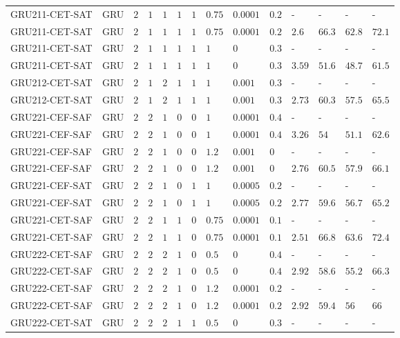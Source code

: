 \begin{table}[tbp]
\begin{tabular}{llllllllllllll}
GRU211-CET-SAT & GRU & $2$ & $1$ & $1$ & $1$ & $1$ & $0.75$ & $0.0001$ & $0.2$ & - & - & - & - \\
GRU211-CET-SAT & GRU & $2$ & $1$ & $1$ & $1$ & $1$ & $0.75$ & $0.0001$ & $0.2$ & $2.6$ & $66.3$ & $62.8$ & $72.1$ \\
GRU211-CET-SAT & GRU & $2$ & $1$ & $1$ & $1$ & $1$ & $1$ & $0$ & $0.3$ & - & - & - & - \\
GRU211-CET-SAT & GRU & $2$ & $1$ & $1$ & $1$ & $1$ & $1$ & $0$ & $0.3$ & $3.59$ & $51.6$ & $48.7$ & $61.5$ \\
GRU212-CET-SAT & GRU & $2$ & $1$ & $2$ & $1$ & $1$ & $1$ & $0.001$ & $0.3$ & - & - & - & - \\
GRU212-CET-SAT & GRU & $2$ & $1$ & $2$ & $1$ & $1$ & $1$ & $0.001$ & $0.3$ & $2.73$ & $60.3$ & $57.5$ & $65.5$ \\
GRU221-CEF-SAF & GRU & $2$ & $2$ & $1$ & $0$ & $0$ & $1$ & $0.0001$ & $0.4$ & - & - & - & - \\
GRU221-CEF-SAF & GRU & $2$ & $2$ & $1$ & $0$ & $0$ & $1$ & $0.0001$ & $0.4$ & $3.26$ & $54$ & $51.1$ & $62.6$ \\
GRU221-CEF-SAF & GRU & $2$ & $2$ & $1$ & $0$ & $0$ & $1.2$ & $0.001$ & $0$ & - & - & - & - \\
GRU221-CEF-SAF & GRU & $2$ & $2$ & $1$ & $0$ & $0$ & $1.2$ & $0.001$ & $0$ & $2.76$ & $60.5$ & $57.9$ & $66.1$ \\
GRU221-CEF-SAT & GRU & $2$ & $2$ & $1$ & $0$ & $1$ & $1$ & $0.0005$ & $0.2$ & - & - & - & - \\
GRU221-CEF-SAT & GRU & $2$ & $2$ & $1$ & $0$ & $1$ & $1$ & $0.0005$ & $0.2$ & $2.77$ & $59.6$ & $56.7$ & $65.2$ \\
GRU221-CET-SAF & GRU & $2$ & $2$ & $1$ & $1$ & $0$ & $0.75$ & $0.0001$ & $0.1$ & - & - & - & - \\
GRU221-CET-SAF & GRU & $2$ & $2$ & $1$ & $1$ & $0$ & $0.75$ & $0.0001$ & $0.1$ & $2.51$ & $66.8$ & $63.6$ & $72.4$ \\
GRU222-CET-SAF & GRU & $2$ & $2$ & $2$ & $1$ & $0$ & $0.5$ & $0$ & $0.4$ & - & - & - & - \\
GRU222-CET-SAF & GRU & $2$ & $2$ & $2$ & $1$ & $0$ & $0.5$ & $0$ & $0.4$ & $2.92$ & $58.6$ & $55.2$ & $66.3$ \\
GRU222-CET-SAF & GRU & $2$ & $2$ & $2$ & $1$ & $0$ & $1.2$ & $0.0001$ & $0.2$ & - & - & - & - \\
GRU222-CET-SAF & GRU & $2$ & $2$ & $2$ & $1$ & $0$ & $1.2$ & $0.0001$ & $0.2$ & $2.92$ & $59.4$ & $56$ & $66$ \\
GRU222-CET-SAT & GRU & $2$ & $2$ & $2$ & $1$ & $1$ & $0.5$ & $0$ & $0.3$ & - & - & - & - \\

\end{tabular}
\end{table}
